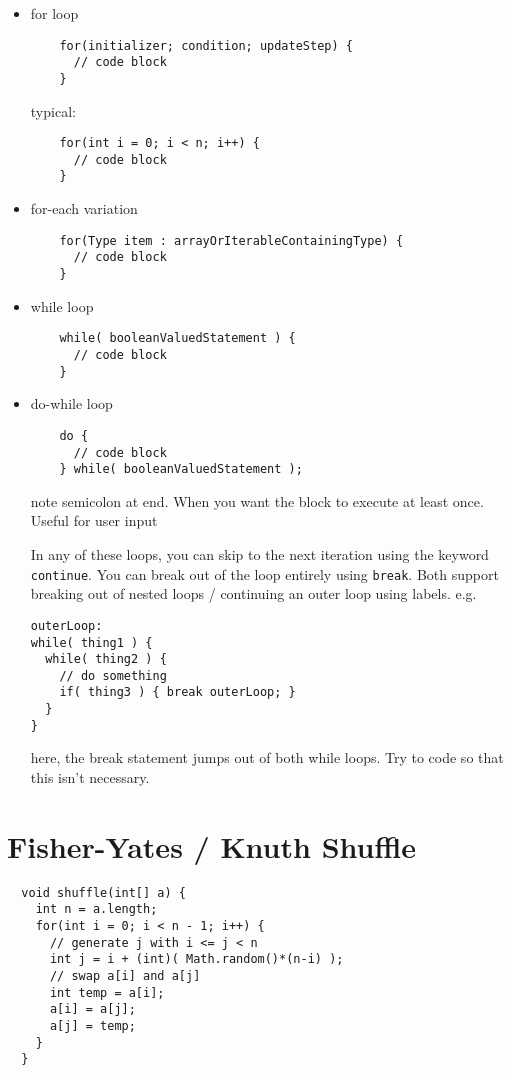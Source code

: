 \documentclass[11pt,letterpaper]{amsart}
\begin{document}
\begin{itemize}
\item for loop
  \begin{verbatim}
    for(initializer; condition; updateStep) {
      // code block
    }
  \end{verbatim}
  typical:
  \begin{verbatim}
    for(int i = 0; i < n; i++) {
      // code block
    }
  \end{verbatim}
\item for-each variation
  \begin{verbatim}
    for(Type item : arrayOrIterableContainingType) {
      // code block
    }
  \end{verbatim}
\item while loop
  \begin{verbatim}
    while( booleanValuedStatement ) {
      // code block
    }
  \end{verbatim}
\item do-while loop
  \begin{verbatim}
    do {
      // code block
    } while( booleanValuedStatement );
  \end{verbatim}
  note semicolon at end. When you want the block to execute at least
  once. Useful for user input
  
  In any of these loops, you can skip to the next iteration using the
  keyword \texttt{continue}. You can break out of the loop entirely
  using \texttt{break}. Both support breaking out of nested loops /
  continuing an outer loop using labels. e.g.
\begin{verbatim}
outerLoop:
while( thing1 ) {
  while( thing2 ) {
    // do something
    if( thing3 ) { break outerLoop; }
  }
}
\end{verbatim}
  here, the break statement jumps out of both while loops. Try to code
  so that this isn't necessary.
  
\end{itemize}

\section{Fisher-Yates / Knuth Shuffle}

\begin{verbatim}
  void shuffle(int[] a) {
    int n = a.length;
    for(int i = 0; i < n - 1; i++) {
      // generate j with i <= j < n
      int j = i + (int)( Math.random()*(n-i) );
      // swap a[i] and a[j]
      int temp = a[i];
      a[i] = a[j];
      a[j] = temp;
    }
  }
\end{verbatim}
\end{document}
